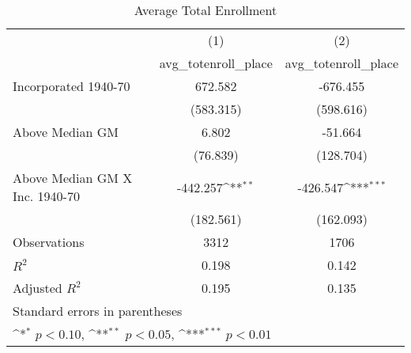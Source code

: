 \begin{table}[htbp]\centering
\def\sym#1{\ifmmode^{#1}\else\(^{#1}\)\fi}
\caption{Average Total Enrollment}
\begin{tabular}{l*{2}{c}}
\hline\hline
                    &\multicolumn{1}{c}{(1)}&\multicolumn{1}{c}{(2)}\\
                    &\multicolumn{1}{c}{avg\_totenroll\_place}&\multicolumn{1}{c}{avg\_totenroll\_place}\\
\hline
Incorporated 1940-70&     672.582         &    -676.455         \\
                    &   (583.315)         &   (598.616)         \\
[1em]
Above Median GM     &       6.802         &     -51.664         \\
                    &    (76.839)         &   (128.704)         \\
[1em]
Above Median GM X Inc. 1940-70&    -442.257\sym{**} &    -426.547\sym{***}\\
                    &   (182.561)         &   (162.093)         \\
\hline
Observations        &        3312         &        1706         \\
\(R^{2}\)           &       0.198         &       0.142         \\
Adjusted \(R^{2}\)  &       0.195         &       0.135         \\
\hline\hline
\multicolumn{3}{l}{\footnotesize Standard errors in parentheses}\\
\multicolumn{3}{l}{\footnotesize \sym{*} \(p<0.10\), \sym{**} \(p<0.05\), \sym{***} \(p<0.01\)}\\
\end{tabular}
\end{table}
